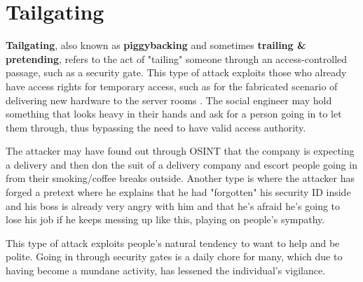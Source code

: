 





\section{Tailgating}

\textbf{Tailgating}, also known as \textbf{piggybacking} and sometimes \textbf{trailing \& pretending}, refers to the act of "tailing" someone through an access-controlled passage, such as a security gate. This type of attack exploits those who already have access rights for temporary access, such as for the fabricated scenario of delivering new hardware to the server rooms \citep{conteh_cybersecurityrisks_2016}. The social engineer may hold something that looks heavy in their hands and ask for a person going in to let them through, thus bypassing the need to have valid access authority.

The attacker may have found out through OSINT that the company is expecting a delivery and then don the suit of a delivery company and escort people going in from their smoking/coffee breaks outside. Another type is where the attacker has forged a pretext where he explains that he had "forgotten" his security ID inside and his boss is already very angry with him and that he's afraid he's going to lose his job if he keeps messing up like this, playing on people's sympathy.

This type of attack exploits people's natural tendency to want to help and be polite. Going in through security gates is a daily chore for many, which due to having become a mundane activity, has lessened the individual's vigilance.








